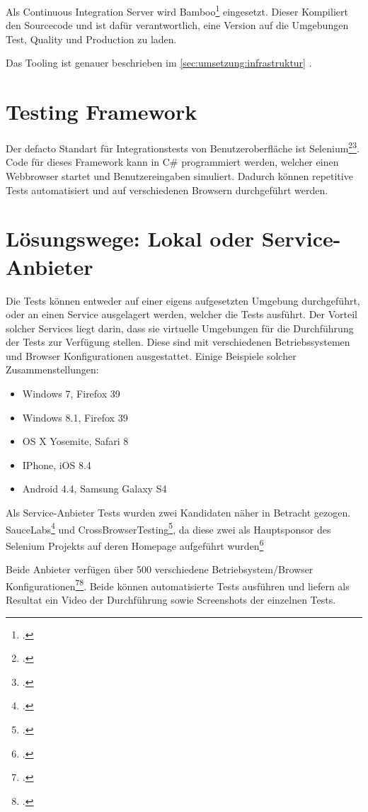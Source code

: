 Als Continuous Integration Server wird Bamboo\footcite{Bamboo_2015-07-26} eingesetzt. Dieser Kompiliert den Sourcecode und ist dafür verantwortlich, eine Version auf die Umgebungen Test, Quality und Production zu laden.

Das Tooling ist genauer beschrieben im \cref{sec:umsetzung:infrastruktur} .

\section{Testing Framework}
\label{sec:Recherche:TestingFrameworks}
Der defacto Standart für Integrationstests von Benutzeroberfläche ist Selenium\footcite{Selenium_-_Web_Browser_Automation_2015-07-26}\footcite{Happy_10th_Birthday_Selenium_ThoughtWorks_2015-07-26}. Code für dieses Framework kann in C\# programmiert werden, welcher einen Webbrowser startet und Benutzereingaben simuliert. Dadurch können repetitive Tests automatisiert und auf verschiedenen Browsern durchgeführt werden.

\section{Lösungswege: Lokal oder Service-Anbieter}
\label{sec:Recherche:loesungswege}
Die Tests können entweder auf einer eigens aufgesetzten Umgebung durchgeführt, oder an einen Service ausgelagert werden, welcher die Tests ausführt. 
Der Vorteil solcher Services liegt darin, dass sie virtuelle Umgebungen für die Durchführung der Tests zur Verfügung stellen. Diese sind mit verschiedenen Betriebssystemen und Browser Konfigurationen ausgestattet. Einige Beispiele solcher Zusammenstellungen:
\begin{itemize}
\item Windows 7, Firefox 39
\item Windows 8.1, Firefox 39
\item OS X Yosemite, Safari 8
\item IPhone, iOS 8.4
\item Android 4.4, Samsung Galaxy S4
\end{itemize}

Als Service-Anbieter Tests wurden zwei Kandidaten näher in Betracht gezogen. SauceLabs\footcite{Sauce_Labs_2015-07-26} und CrossBrowserTesting\footcite{Cross_Browser_Testing_2015-07-26}, da diese zwei als Hauptsponsor des Selenium Projekts auf deren Homepage aufgeführt wurden\footcite{Seleniumhq}

Beide Anbieter verfügen über 500 verschiedene Betriebsystem/Browser Konfigurationen\footcite{Platforms_2015-07-26}\footcite{OS_Browser_Configurations_for_Cross_Browser_Compatibility_Testing_2015-07-26}. Beide können automatisierte Tests ausführen und liefern als Resultat ein Video der Durchführung sowie Screenshots der einzelnen Tests.

